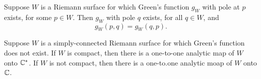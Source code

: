 \documentclass[12pt]{article}
\begin{document}
\begin{sats}
    Suppose $W$ is a Riemann surface for which Green's function $g_W$ with pole at $p$ exists, for some $p\in W$. Then $g_W$ with pole $q$ exists, for all $q\in W$, and 
    \begin{equation*}
        g_W(p,q)=g_W(q,p).
    \end{equation*}
\end{sats}

\begin{sats}
    Suppose $W$ is a simply-connected Riemann surface for which Green's function does not exist. If $W$ is compact, then there is a one-to-one analytic map of $W$ onto $\mathbb{C}^*$. If $W$ is not compact, then there is a one-to.one analytic moap of $W$ onto $\mathbb{C}$.
\end{sats}
\end{document}
